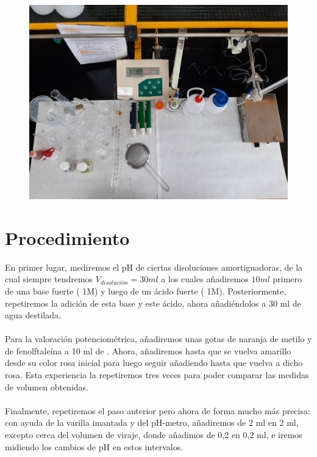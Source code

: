 \begin{figure}[H]
    \centering
    \hspace*{-2.3cm}
        \includegraphics[scale = 0.15, angle=180]{prac3/Inventario3.jpeg}
    \hspace*{-2.3cm}
    \vspace{-2cm}
\end{figure}

\clearpage

\section{Procedimiento}
\noindent En primer lugar, mediremos el pH de ciertas disoluciones amortiguadoras, de la cual siempre tendremos $V_{disolución} = 30 \si{ml}$ a los cuales añadiremos $10 \si{ml}$ primero de una base fuerte ( 1\si{M}) y luego de un ácido fuerte ( 1\si{M}). Posteriormente, repetiremos la adición de esta base y este ácido, ahora añadiéndolos a 30 \si{ml} de agua destilada.\\\\
Para la valoración potenciométrica, añadiremos unas gotas de naranja de metilo y de fenolftaleína a 10 \si{ml} de . Ahora, añadiremos  hasta que se vuelva amarillo desde su color rosa inicial para luego seguir añadiendo hasta que vuelva a dicho rosa. Esta experiencia la repetiremos tres veces para poder comparar las medidas de volumen obtenidas.\\\\
Finalmente, repetiremos el paso anterior pero ahora de forma mucho más precisa: con ayuda de la varilla imantada y del pH-metro, añadiremos  de 2 \si{ml} en 2 \si{ml}, excepto cerca del volumen de viraje, donde añadimos de 0,2 en 0,2 \si{ml}, e iremos midiendo los cambios de pH en estos intervalos.

